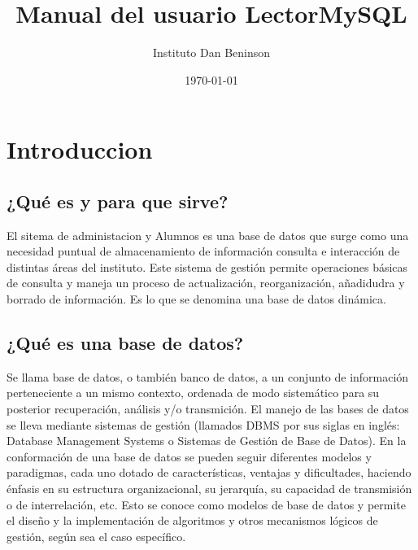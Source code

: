 \documentclass[a4paper,10pt]{article}
\author{Instituto Dan Beninson}%
\date{\today}%
\title{Manual del usuario LectorMySQL}%
\begin{document}
\maketitle
{}

\clearpage

\tableofcontents
\clearpage

\section{Introduccion}
\subsection{¿Qué es y para que sirve?}
El sitema de administacion y Alumnos es una base de datos que surge como una 
necesidad puntual de almacenamiento de información consulta e interacción de 
distintas áreas del instituto. 
Este sistema de gestión permite operaciones básicas de consulta y maneja un 
proceso de actualización, reorganización, añadidudra y borrado de información. 
Es lo que se denomina una base de datos dinámica.


\subsection{¿Qué es una base de datos?}
Se llama base de datos, o también banco de datos, a un conjunto de información 
perteneciente a un mismo contexto, ordenada de modo sistemático para su 
posterior recuperación, análisis y/o transmición.
El manejo de las bases de datos se lleva mediante sistemas de gestión (llamados 
DBMS por sus siglas en inglés: Database Management Systems o Sistemas de Gestión 
de Base de Datos).
En la conformación de una base de datos se pueden seguir diferentes modelos y 
paradigmas, cada uno dotado de características, ventajas y dificultades, 
haciendo énfasis en su estructura organizacional, su jerarquía, su capacidad de 
transmisión o de interrelación, etc. Esto se conoce como modelos de base de 
datos y permite el diseño y la implementación de algoritmos y otros mecanismos 
lógicos de gestión, según sea el caso específico.
\end{document}
